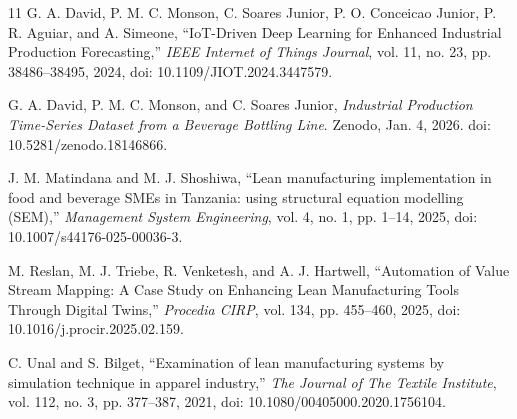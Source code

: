 \documentclass[conference]{IEEEtran}
\begin{document}
\begin{thebibliography}{11}
G. A. David, P. M. C. Monson, C. Soares Junior, P. O. Conceicao Junior, P. R. Aguiar, and A. Simeone, ``IoT-Driven Deep Learning for Enhanced Industrial Production Forecasting,'' \emph{IEEE Internet of Things Journal}, vol. 11, no. 23, pp. 38486--38495, 2024, doi: 10.1109/JIOT.2024.3447579.

G. A. David, P. M. C. Monson, and C. Soares Junior, \emph{Industrial Production Time-Series Dataset from a Beverage Bottling Line}. Zenodo, Jan. 4, 2026. doi: 10.5281/zenodo.18146866.

J. M. Matindana and M. J. Shoshiwa, ``Lean manufacturing implementation in food and beverage SMEs in Tanzania: using structural equation modelling (SEM),'' \emph{Management System Engineering}, vol. 4, no. 1, pp. 1--14, 2025, doi: 10.1007/s44176-025-00036-3.

M. Reslan, M. J. Triebe, R. Venketesh, and A. J. Hartwell, ``Automation of Value Stream Mapping: A Case Study on Enhancing Lean Manufacturing Tools Through Digital Twins,'' \emph{Procedia CIRP}, vol. 134, pp. 455--460, 2025, doi: 10.1016/j.procir.2025.02.159.

C. Unal and S. Bilget, ``Examination of lean manufacturing systems by simulation technique in apparel industry,'' \emph{The Journal of The Textile Institute}, vol. 112, no. 3, pp. 377--387, 2021, doi: 10.1080/00405000.2020.1756104.

\end{thebibliography}
\end{document}
